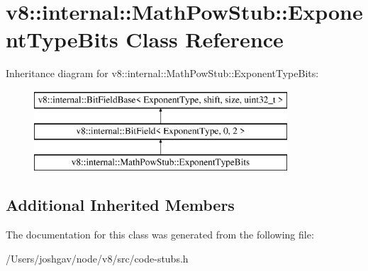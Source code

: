 \hypertarget{classv8_1_1internal_1_1_math_pow_stub_1_1_exponent_type_bits}{}\section{v8\+:\+:internal\+:\+:Math\+Pow\+Stub\+:\+:Exponent\+Type\+Bits Class Reference}
\label{classv8_1_1internal_1_1_math_pow_stub_1_1_exponent_type_bits}
Inheritance diagram for v8\+:\+:internal\+:\+:Math\+Pow\+Stub\+:\+:Exponent\+Type\+Bits\+:\begin{figure}[H]
\begin{center}
\leavevmode
\includegraphics[height=3.000000cm]{classv8_1_1internal_1_1_math_pow_stub_1_1_exponent_type_bits}
\end{center}
\end{figure}
\subsection*{Additional Inherited Members}


The documentation for this class was generated from the following file\+:\begin{DoxyCompactItemize}
\item 
/\+Users/joshgav/node/v8/src/code-\/stubs.\+h\end{DoxyCompactItemize}
